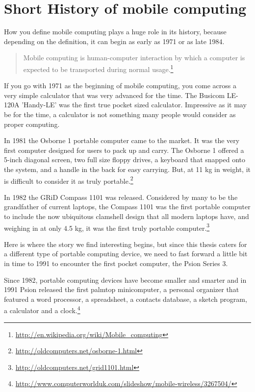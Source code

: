 \chapter{Short History of mobile computing}\label{ch:history}

How you define mobile computing plays a huge role in its history, because depending on the definition, it can begin as early as 1971 or as late 1984.

\begin{quotation}
Mobile computing is human-computer interaction by which a computer is expected to be transported during normal usage.\footnote{\url{http://en.wikipedia.org/wiki/Mobile_computing}}
\end{quotation}

If you go with 1971 as the beginning of mobile computing, you come across a very simple calculator that was very advanced for the time. The Busicom LE-120A 'Handy-LE' was the first true pocket sized calculator. Impressive as it may be for the time, a calculator is not something many people would consider as proper computing.

In 1981 the Osborne 1 portable computer came to the market. It was the very first computer designed for users to pack up and carry. The Osborne 1 offered a 5-inch diagonal screen, two full size floppy drives, a keyboard that snapped onto the system, and a handle in the back for easy carrying. But, at 11 kg in weight, it is difficult to consider it as truly portable.\footnote{\url{http://oldcomputers.net/osborne-1.html}}

In 1982 the GRiD Compass 1101 was released. Considered by many to be the grandfather of current laptops, the Compass 1101 was the first portable computer to include the now ubiquitous clamshell design that all modern laptops have, and weighing in at only 4.5 kg, it was the first truly portable computer.\footnote{\url{http://oldcomputers.net/grid1101.html}}

Here is where the story we find interesting begins, but since this thesis caters for a different type of portable computing device, we need to fast forward a little bit in time to 1991 to encounter the first pocket computer, the Psion Series 3.

Since 1982, portable computing devices have become smaller and smarter and in 1991 Psion released the first palmtop minicomputer, a personal organizer that featured a word processor, a spreadsheet, a contacts database, a sketch program, a calculator and a clock.\footnote{\url{http://www.computerworlduk.com/slideshow/mobile-wireless/3267504/}}

